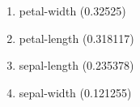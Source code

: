 \begin{enumerate}
\item petal-width (0.32525)
\item petal-length (0.318117)
\item sepal-length (0.235378)
\item sepal-width (0.121255)
\end{enumerate}